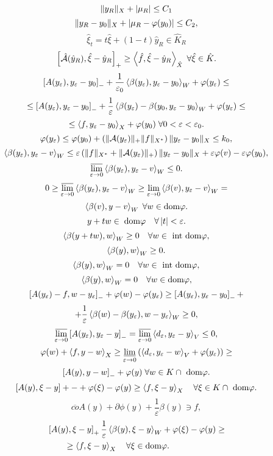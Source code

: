 \documentclass[12pt]{book} %
\let\epsilon\varepsilon
\begin{document}
\[\|y_R\|_X+\left|\mu_R\right|\leq C_1\]
\[\|y_R-y_0\|_X+\left|\mu_R-\varphi(y_0)\right|\leq C_2,\]
\[\hat{\xi}_t=t\hat{\xi}+(1-t)\hat{y}_R\in\hat{K}_R\]
\[\left[\hat{\mathcal{A}}(\hat{y}_R),\hat{\xi}-\hat{y}_R\right]_+\geq\left<\hat{f},\hat{\xi}-\hat{y}_R\right>_{\hat{X}}\;\forall\hat{\xi}\in\hat{K}.\]
\[\mysbra{A(y_\epsilon),y_\epsilon-y_0}_-+\frac{1}{\epsilon_0}\mysca{\beta(y_\epsilon)}{y_\epsilon-y_0}_W+\phi(y_\epsilon)\leq\]
\[\leq\mysbra{A(y_\epsilon),y_\epsilon-y_0}_-+\frac{1}{\epsilon}\mysca{\beta(y_\epsilon)-\beta(y_0}{y_\epsilon-y_0}_W+\phi(y_\epsilon)\leq\]
\[\leq\mysca{f}{y_\epsilon-y_0}_X+\phi(y_0)\;\forall0<\epsilon<\epsilon_0.\]
\[\phi(y_\epsilon)\leq\phi(y_0)+\mybra{\mynorm{\mathcal{A}(y_\epsilon)}_+\mynorm{f}_{X^*}}\mynorm{y_\epsilon-y_0}_{X}\leq k_0,\]
\[\mysca{\beta(y_\epsilon)}{y_\epsilon-v}_W\leq\epsilon\mybra{\mynorm{f}_{X^*}+\mynorm{\mathcal{A}(y_\epsilon)}_+}\mynorm{y_\epsilon-y_0}_X+\epsilon
\phi(v)-\epsilon\phi(y_0),\]
\[\varlimsup_{\epsilon\to0}\mysca{\beta(y_\epsilon)}{y_\epsilon-v}_W\leq0.\]
\[0\geq\varlimsup_{\epsilon\to0}\mysca{\beta(y_\epsilon)}{y_\epsilon-v}_W\geq\lim_{\epsilon\to0}\mysca{\beta(v)}{y_\epsilon-v}_W=\]
\[\left<\beta(v),y-v\right>_W\;\forall w\in\mbox{dom}\varphi.\]
\[y+tw\in\;\mbox{dom}\phi\quad\forall\myabs{t}<\epsilon.\]
\[\left<\beta(y+tw),w\right>_W\geq0\quad\forall w\in\mbox{ int dom}\varphi,\]
\[\left<\beta(y),w\right>_W\geq0.\]
\[\left<\beta(y),w\right>_W=0\quad\forall w\in\mbox{ int dom}\varphi,\]
\[\left<\beta(y),w\right>_W=0\quad\forall w\in\mbox{dom}\varphi,\]
\[\mysbra{A(y_\epsilon)-f,w-y_\epsilon}_-+\phi(w)-\phi(y_\epsilon)\geq\mysbra{A(y_\epsilon),y_\epsilon-y_0}_-+\]
\[+\frac{1}{\epsilon}\mysca{\beta(w)-\beta(y_\epsilon)}{w-y_\epsilon}_W\geq0,\]
\[\varlimsup_{\epsilon\to0}\mysbra{A(y_\epsilon),y_\epsilon-y}_-=\varlimsup_{\epsilon\to0}\mysca{d_\epsilon}{y_\epsilon-y}_V\leq0,\]
\[\phi(w)+\mysca{f}{y-w}_X\geq\varliminf_{\epsilon\to0}\mybra{\mysca{d_\epsilon}{y_\epsilon-w}_V+\phi(y_\epsilon)}\geq\]
\[\left[A(y),y-w\right]_-+\varphi(y)\;\forall w\in K\cap\mbox{ dom}\varphi.\]
\begin{equation}\left[A(y),\xi-y\right]+-+\varphi(\xi)-\varphi(y)\geq\left<f,\xi-y\right>_X\quad\forall \xi\in K\cap\mbox{ dom}\varphi.\end{equation}
\begin{equation}\overline{co}A(y)+\partial\phi(y)+\frac{1}{\epsilon}\beta(y)\ni f,\end{equation}
\begin{equation}\begin{aligned}
	&\mysbra{A(y),\xi-y}_+\frac{1}{\epsilon}\mysca{\beta(y)}{\xi-y}_W+\phi(\xi)-\phi(y)\geq\\
	&\qquad\geq\mysca{f}{\xi-y}_X\quad\forall\xi\in\mbox{dom}\phi.
\end{aligned}\end{equation}
\end{document}
